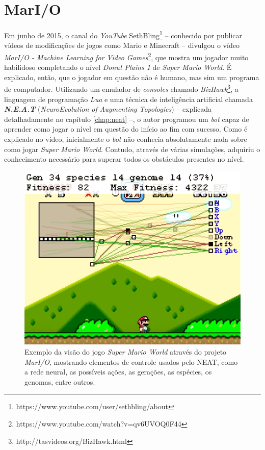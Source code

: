\section{MarI/O}
Em junho de 2015, o canal do \textit{YouTube}
SethBling\footnote{https://www.youtube.com/user/sethbling/about} -- conhecido
por publicar vídeos de modificações de jogos como Mario e Minecraft -- divulgou
o vídeo \textit{MarI/O - Machine Learning for Video
Games}\footnote{https://www.youtube.com/watch?v=qv6UVOQ0F44}, que mostra um
jogador muito habilidoso completando o nível \textit{Donut Plains 1} de
\textit{Super Mario World}. É explicado, então, que o jogador em questão não é
humano, mas sim um programa de computador. Utilizando um emulador de
\textit{consoles} chamado
\textit{BizHawk}\footnote{http://tasvideos.org/BizHawk.html}, a linguagem de
programação \textit{Lua} e uma técnica de inteligência artificial chamada
\textit{\textbf{N.E.A.T}} (\textit{NeuroEvolution of Augmenting Topologies})
\cite{stanley:ec02} -- explicada detalhadamente no capítulo \ref{chap:neat} --,
o autor programou um \textit{bot} capaz de aprender como jogar o nível em
questão do início ao fim com sucesso. Como é explicado no vídeo, inicialmente o
\textit{bot} não conhecia absolutamente nada sobre como jogar \textit{Super
Mario World}. Contudo, através de várias simulações, adquiriu o conhecimento
necessário para superar todos os obstáculos presentes no nível.

\begin{figure}[htb!]
\centering
\includegraphics[width=.65\textwidth]{fig/mar-io-example.png}
\caption{\label{fig:mar-io-example}Exemplo da visão do jogo \textit{Super
Mario World} através do projeto \textit{MarI/O}, mostrando elementos de
controle usados pelo NEAT, como a rede neural, as possíveis ações, as
gerações, as espécies, os genomas, entre outros.}
\end{figure}

